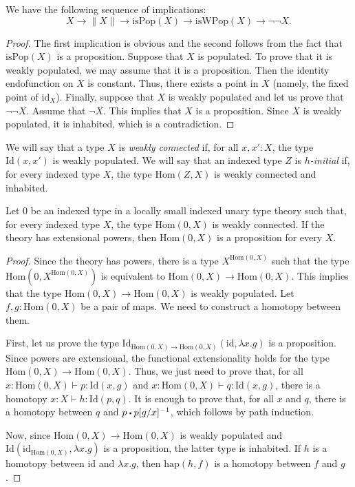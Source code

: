 \documentclass[reqno]{amsart}
\theoremstyle{definition}
\theoremstyle{remark}
\newcommand{\fs}[1]{\mathrm{#1}}
\newcommand{\Hom}{\fs{Hom}}
\newcommand{\Id}{\fs{Id}}
\newcommand{\sym}[1]{#1^{-1}}
\newcommand{\id}{\fs{id}}
\numberwithin{figure}{section}
\newcommand{\ct}{%
  \mathchoice{\mathbin{\raisebox{0.25ex}{$\displaystyle\centerdot$}}}%
             {\mathbin{\raisebox{0.25ex}{$\centerdot$}}}%
             {\mathbin{\raisebox{0.25ex}{$\scriptstyle\,\centerdot\,$}}}%
             {\mathbin{\raisebox{0.25ex}{$\scriptscriptstyle\,\centerdot\,$}}}
}
\begin{document}
\begin{prop}
We have the following sequence of implications:
\[ X \to \| X \| \to \mathrm{isPop}(X) \to \mathrm{isWPop}(X) \to \neg \neg X. \]
\end{prop}
\begin{proof}
The first implication is obvious and the second follows from the fact that $\mathrm{isPop}(X)$ is a proposition.
Suppose that $X$ is populated.
To prove that it is weakly populated, we may assume that it is a proposition.
Then the identity endofunction on $X$ is constant.
Thus, there exists a point in $X$ (namely, the fixed point of $\id_X$).
Finally, suppose that $X$ is weakly populated and let us prove that $\neg \neg X$.
Assume that $\neg X$.
This implies that $X$ is a proposition.
Since $X$ is weakly populated, it is inhabited, which is a contradiction.
\end{proof}

We will say that a type $X$ is \emph{weakly connected} if, for all $x, x' : X$, the type $\Id(x,x')$ is weakly populated.
We will say that an indexed type $Z$ is \emph{$h$-initial} if, for every indexed type $X$, the type $\Hom(Z,X)$ is weakly connected and inhabited.

\begin{prop}
Let $0$ be an indexed type in a locally small indexed unary type theory such that, for every indexed type $X$, the type $\Hom(0,X)$ is weakly connected.
If the theory has extensional powers, then $\Hom(0,X)$ is a proposition for every $X$.
\end{prop}
\begin{proof}
Since the theory has powers, there is a type $X^{\Hom(0,X)}$ such that the type $\Hom(0,X^{\Hom(0,X)})$ is equivalent to $\Hom(0,X) \to \Hom(0,X)$.
This implies that the type $\Hom(0,X) \to \Hom(0,X)$ is weakly populated.
Let $f,g : \Hom(0,X)$ be a pair of maps.
We need to construct a homotopy between them.

First, let us prove the type $\Id_{\Hom(0,X) \to \Hom(0,X)}(\id, \lambda x.g)$ is a proposition.
Since powers are extensional, the functional extensionality holds for the type $\Hom(0,X) \to \Hom(0,X)$.
Thus, we just need to prove that, for all $x : \Hom(0,X) \vdash p : \Id(x,g)$ and $x : \Hom(0,X) \vdash q : \Id(x,g)$, there is a homotopy $x : X \vdash h : \Id(p,q)$.
It is enough to prove that, for all $x$ and $q$, there is a homotopy between $q$ and $p \ct \sym{p[g/x]}$, which follows by path induction.

Now, since $\Hom(0,X) \to \Hom(0,X)$ is weakly populated and $\Id(\id_{\Hom(0,X)}, \lambda x.g)$ is a proposition, the latter type is inhabited.
If $h$ is a homotopy between $\id$ and $\lambda x.g$, then $\fs{hap}(h,f)$ is a homotopy between $f$ and $g$.
\end{proof}
\end{document}
